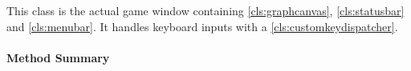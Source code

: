 
This class is the actual game window containing \ref{cls:graphcanvas}, \ref{cls:statusbar} and \ref{cls:menubar}. It handles keyboard inputs with a \ref{cls:customkeydispatcher}. \\ 

\centerdash

\paragraph*{Method Summary}
\paragraph*{}
